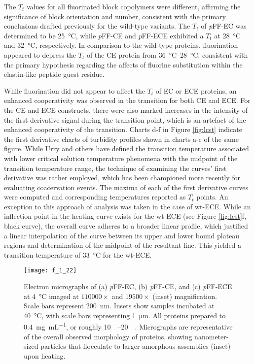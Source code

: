 \begin{refsection}
The ${T_t}$ values for all fluorinated block copolymers were different, affirming
the significance of block orientation and number, consistent with the primary
conclusions drafted previously for the wild-type
variants.\cite{Haghpanah2010,Haghpanah2009} The ${T_t}$ of \emph{p}FF-EC was determined
to be \SI{25}{\celsius}, while \emph{p}FF-CE and \emph{p}FF-ECE exhibited a ${T_t}$ at
\SI{28}{\celsius} and \SI{32}{\celsius}, respectively. In comparison to the
wild-type proteins, fluorination appeared to depress the ${T_t}$ of the CE
protein from \SIrange{36}{28}{\celsius}, consistent with the primary hypothesis
regarding the affects of fluorine substitution within the elastin-like peptide
guest residue.

While fluorination did not appear to affect the ${T_t}$ of EC or ECE proteins,
an enhanced cooperativity was observed in the transition for both CE and ECE.
For the CE and ECE constructs, there were also marked increases in the intensity
of the first derivative signal during the transition point, which is an artefact
of the enhanced cooperativity of the transition.  Charts d-f in Figure
\ref{fig:lcst} indicate the first derivative charts of turbidity profiles shown
in charts a-c of the same figure. While Urry and others have defined the
transition temperature associated with lower critical solution temperature
phenomena with the midpoint of the transition temperature
range,\cite{Urry1993,Nuhn2008} the technique of examining the curves' first
derivative was rather employed, which has been championed more recently for
evaluating coacervation
events.\cite{Furgeson2006,Liu2010b,Mackay2010a,Meyer2004} The maxima of each of
the first derivative curves were computed and corresponding temperatures
reported as ${T_t}$ points.  An exception to this approach of analysis was taken
in the case of wt-ECE. While an inflection point in the heating curve exists for
the wt-ECE (see Figure \ref{fig:lcst}f, black curve), the overall curve adheres
to a broader linear profile, which justified a linear interpolation of the curve
between its upper and lower bound plateau regions and determination of the
midpoint of the resultant line. This yielded a transition temperature of
\SI{33}{\celsius} for the wt-ECE.

\begin{figure}[h!] \centering \texttt{[image: f\_1\_22]}
    \caption{Electron micrographs of (a) \emph{p}FF-EC, (b) \emph{p}FF-CE, and
    (c) \emph{p}FF-ECE at \SI{4}{\celsius} imaged at ${110000 \times}$ and
    ${19500 \times}$ (inset) magnification. Scale bars represent \SI{200}{\nm}.
    Insets show samples incubated at \SI{40}{\celsius}, with scale bars
    representing \SI{1}{\um}. All proteins prepared to \SI{0.4}{\mg\per\mL}, or
    roughly \SIrange{10}{20}{\micro\moLar}. Micrographs are representative of
    the overall observed morphology of proteins, showing nanometer-sized
    particles that flocculate to larger amorphous assemblies (inset) upon heating.}
    \label{fig:block_EM_pFF}
\end{figure}


\end{refsection}
